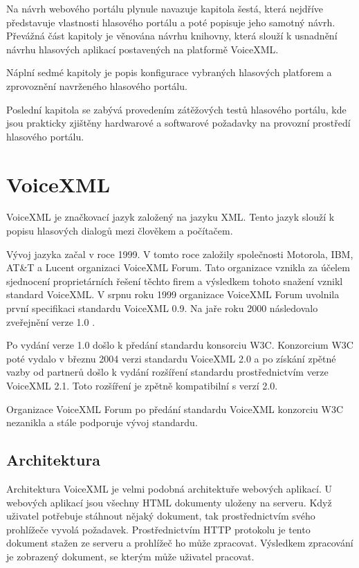 \documentclass[ing,male,java,dept460,twoside]{diploma}						%
\begin{document}
Na návrh webového portálu plynule navazuje kapitola šestá, která nejdříve představuje vlastnosti hlasového portálu a poté popisuje jeho samotný návrh. Převážná část kapitoly je věnována návrhu knihovny, která slouží k usnadnění návrhu hlasových aplikací postavených na platformě VoiceXML.

Náplní sedmé kapitoly je popis konfigurace vybraných hlasových platforem a zprovoznění navrženého hlasového portálu.

Poslední kapitola se zabývá provedením zátěžových testů hlasového portálu, kde jsou prakticky zjištěny hardwarové a softwarové požadavky na provozní prostředí hlasového portálu.

\section{VoiceXML}
\label{sec:VoiceXML}
VoiceXML je značkovací jazyk založený na jazyku XML. Tento jazyk slouží k popisu hlasových dialogů mezi člověkem a počítačem.

Vývoj jazyka začal v roce 1999. V tomto roce založily společnosti Motorola, IBM, AT\&T a Lucent organizaci VoiceXML Forum. Tato organizace vznikla za účelem sjednocení proprietárních řešení těchto firem a výsledkem tohoto snažení vznikl standard VoiceXML. V srpnu roku 1999 organizace VoiceXML Forum uvolnila první specifikaci standardu VoiceXML 0.9. Na jaře roku 2000 následovalo zveřejnění verze 1.0 \cite{vxmldevguide}.

Po vydání verze 1.0 došlo k předání standardu konsorciu W3C. Konzorcium W3C poté vydalo v březnu 2004 verzi standardu VoiceXML 2.0 a po získání zpětné vazby od partnerů došlo k vydání rozšíření standardu prostřednictvím verze VoiceXML 2.1. Toto rozšíření je zpětně kompatibilní s verzí 2.0.

Organizace VoiceXML Forum po předání standardu VoiceXML konzorciu W3C nezanikla a stále podporuje vývoj standardu.

\subsection{Architektura}
Architektura VoiceXML je velmi podobná architektuře webových aplikací. U webových aplikací jsou všechny HTML dokumenty uloženy na serveru. Když uživatel potřebuje stáhnout nějaký dokument, tak prostřednictvím svého prohlížeče vyvolá požadavek. Prostřednictvím HTTP protokolu je tento dokument stažen ze serveru a prohlížeč ho může zpracovat. Výsledkem zpracování je zobrazený dokument, se kterým může uživatel pracovat.
\end{document}
